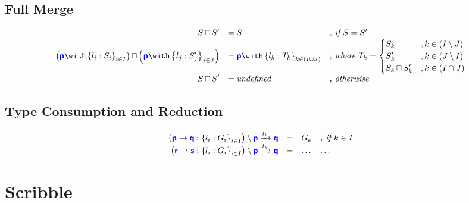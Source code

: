 \documentclass{article}
\begin{document}
\subsection{Full Merge}
\doublespacing
\[
\begin{array}{>{\displaystyle}r>{\displaystyle}ll}
		\tymerge{S}{S'} & = S & \textit{, if $S = S'$} \\
		\tymerge{\left(\tybra{p}{l_i: S_i}{i \in I}\right)}{\left(\tybra{p}{l_j: S'_j}{j \in J}\right)} & = \tybra{p}{l_k: T_k}{k \in (I \cup J)} & \textit{, where } T_k = \begin{cases}
S_k & , k \in \left(I \setminus J\right) \\
S'_k & , k \in \left(J \setminus I\right) \\
\tymerge{S_k}{S'_k} & , k \in \left(I \cap J\right)
\end{cases} \\
		\tymerge{S}{S'} & = \textit{undefined} & \textit{, otherwise}\\
\end{array}
\]
\singlespacing

\subsection{Type Consumption and Reduction}
\doublespacing
\[
\begin{array}{rcll}
	\tyreduct{\left(\gcomm{p}{q}{l_i: G_i}{i \in I}\right)}{p}{q}{l_k} & = & G_k & \textit{, if $k \in I$}\\
	\tyreduct{\left(\gcomm{r}{s}{l_i: G_i}{i \in I}\right)}{p}{q}{l_k} & = & \dots & \dots \\
\end{array}
\]
\singlespacing

\section{Scribble}
\end{document}
